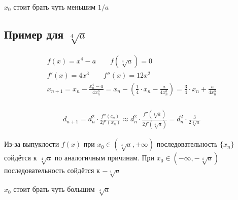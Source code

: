 \quad

$x_0$ стоит брать чуть меньшим $1/a$

\subsection{Пример для $\sqrt[4]{a}$}

\begin{gather}
    f(x) = x^4 - a \qquad f(\sqrt[4]{a}) = 0 \\
    f'(x) = 4x^3 \qquad f''(x) = 12x^2 \\
    x_{n + 1} = x_n - \frac{x_n^4 - a}{4x_n^3} = x_n - \left(\frac{1}{4} \cdot x_n - \frac{a}{4x_n^3}\right) = \frac{3}{4} \cdot x_n + \frac{a}{4 x_n^3} \\
\end{gather}


\begin{gather}
    d_{n + 1} = d_n^2 \cdot \frac{f''(c_n)}{2f'(x_n)} \approx d_n^2 \cdot \frac{f''(\sqrt[4]{a})}{2f'(\sqrt[4]{a})} = d_n^2 \cdot \frac{3}{2 \sqrt[4]{a}}
\end{gather}

\begin{center}
\end{center}

Из-за выпуклости $f(x)$ при $x_0 \in \left(\sqrt[4]{a}, +\infty\right)$ последовательность $\{x_n\}$ сойдётся к $\sqrt[4]{a}$ по аналогичным причинам.
При $x_0 \in (-\infty, -\sqrt[4]{a})$ последовательность сойдётся к $-\sqrt[4]{a}$

\quad

$x_0$ стоит брать чуть большим $\sqrt[4]{a}$



